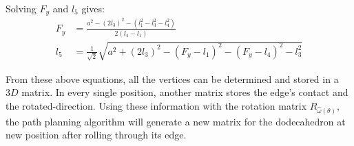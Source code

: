 \noindent Solving $F_y$ and $l_5$ gives:
\begin{equation*} 
\label{dodeca:eq3}
\begin{split}
F_y & = \frac{a^2-(2l_3)^2-(l_1^2-l_3^2-l_4^2)}{2(l_4-l_1)} \\
l_5 & = \frac{1}{\sqrt{2}}\sqrt{a^2+(2l_3)^2-(F_y-l_1)^2-(F_y-l_4)^2-l_3^2}
\end{split}
\end{equation*}

\noindent From these above equations, all the vertices can be determined and stored in a $3D$ matrix. 
In every single position, another matrix stores the edge's contact and the rotated-direction. 
Using these information with the rotation matrix $R_{\hat{\omega}(\theta)}$, the path planning algorithm will generate a new matrix for the dodecahedron at new position after rolling through its edge.\\
%
%

